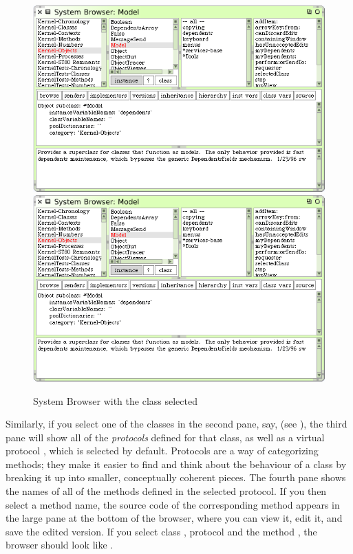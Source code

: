 \documentclass[a4paper,10pt,twoside]{book}
\begin{document}
\begin{figure}[htbp]
   \centering
   \ifluluelse
	   {\includegraphics[width=\textwidth]{SystemBrowser1} }
	   {\includegraphics[scale=.7]{SystemBrowser1} }
   \caption{System Browser with the class  selected
   \label{fig:SystemBrowserModel}}
\end{figure}

Similarly, if you select one of the classes in the second pane, say,  (see  ), the third pane will show all of the \emph{protocols} defined for that class, as well as a virtual protocol , which is selected by default. 
Protocols are a way of categorizing methods; they make it easier to find and think about the behaviour of a class by breaking it up into smaller, conceptually coherent pieces.  
The fourth pane shows the names of all of the methods defined in the selected protocol.
If you then select a method name, the source code of the corresponding method appears in the large pane at the bottom of the browser, where you can view it, edit it, and save the edited version.
If you select class ,  protocol  and the method , the browser should look like .
\end{document}
